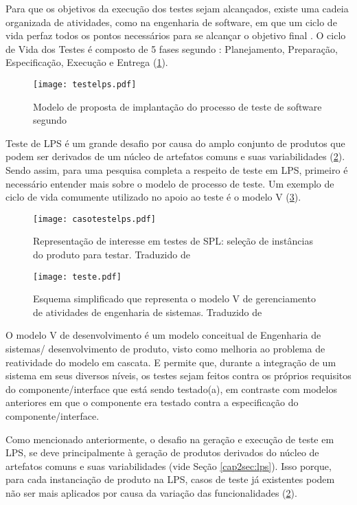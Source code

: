 Para que os objetivos da execução dos testes sejam alcançados, existe uma cadeia organizada de atividades, como na engenharia de software, em que um ciclo de vida perfaz todos os pontos necessários para se alcançar o objetivo final \cite{delamaro2017introduccao}. O ciclo de Vida dos Testes é composto de 5 fases segundo \citet{crespo2004metodologia}: Planejamento, Preparação, Especificação, Execução e Entrega (\ref{fig:testelps}).

\begin{figure}[h!]
	\centering
	\texttt{[image: testelps.pdf]}
	\caption{Modelo de proposta de implantação do processo de teste de software segundo \citet{crespo2004metodologia}}
	\label{fig:testelps}
\end{figure}

Teste de LPS é um grande desafio por causa do amplo conjunto de produtos que podem ser derivados de um núcleo de artefatos comuns e suas variabilidades (\ref{fig:casotestelps}). Sendo assim, para uma pesquisa completa a respeito de teste em LPS, primeiro é necessário entender mais sobre o modelo de processo de teste. Um exemplo de ciclo de vida comumente utilizado no apoio ao teste é o modelo V (\ref{fig:testeV}).

\begin{figure}[h!]
	\centering
	\texttt{[image: casotestelps.pdf]}
	\caption{ Representação de interesse em testes de SPL: seleção de instâncias do produto para testar. Traduzido de \citet{do2014strategies}}
	\label{fig:casotestelps}
\end{figure}

\begin{figure}[h!]
	\centering
	\texttt{[image: teste.pdf]}
	\caption{Esquema simplificado que representa o modelo V de gerenciamento de atividades de engenharia de sistemas. Traduzido de \citet{do2014strategies}}
	\label{fig:testeV}
\end{figure}

O modelo V de desenvolvimento é um modelo conceitual de Engenharia de sistemas/
desenvolvimento de produto, visto como melhoria ao problema de reatividade do modelo em cascata. E permite que, durante a integração de um sistema em seus diversos níveis, os testes sejam feitos contra os próprios requisitos do componente/interface que está sendo testado(a), em contraste com modelos anteriores em que o componente era testado contra a especificação do componente/interface.

Como mencionado anteriormente, o desafio na geração e execução de teste em LPS, se deve principalmente à geração de produtos derivados do núcleo de artefatos comuns e suas variabilidades (vide Seção \ref{cap2sec:lps}). Isso porque, para cada instanciação de produto na LPS, casos de teste já existentes podem não ser mais aplicados por causa da variação das funcionalidades (\ref{fig:casotestelps}). 

